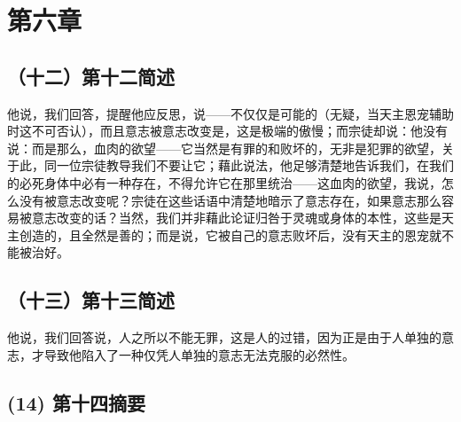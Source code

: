 \section{第六章}


\subsection{（十二）第十二简述}

他说，我们回答，提醒他应反思，说——不仅仅是可能的（无疑，当天主恩宠辅助时这不可否认），而且意志被意志改变是，这是极端的傲慢；而宗徒却说：他没有说：而是那么，血肉的欲望——它当然是有罪的和败坏的，无非是犯罪的欲望，关于此，同一位宗徒教导我们不要让它；藉此说法，他足够清楚地告诉我们，在我们的必死身体中必有一种存在，不得允许它在那里统治——这血肉的欲望，我说，怎么没有被意志改变呢？宗徒在这些话语中清楚地暗示了意志存在，如果意志那么容易被意志改变的话？当然，我们并非藉此论证归咎于灵魂或身体的本性，这些是天主创造的，且全然是善的；而是说，它被自己的意志败坏后，没有天主的恩宠就不能被治好。\par


\subsection{（十三）第十三简述}

他说，我们回答说，人之所以不能无罪，这是人的过错，因为正是由于人单独的意志，才导致他陷入了一种仅凭人单独的意志无法克服的必然性。\par


\subsection{(14) 第十四摘要}

